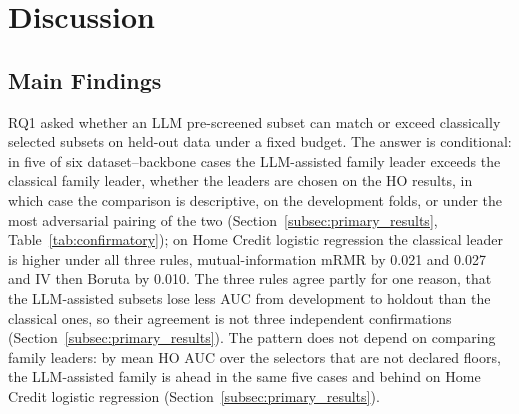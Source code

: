 \documentclass[final,5p,twocolumn]{elsarticle}
\providecommand{\DIFaddbegin}{} %
\begin{document}

\section{Discussion}
\label{sec:discussion}

\subsection{Main Findings}
\label{subsec:main_findings}

RQ1 asked whether an LLM pre-screened subset can match or exceed classically selected subsets on held-out data under a fixed budget. The answer is conditional: in five of six dataset--backbone cases the LLM-assisted family leader exceeds the classical family leader, whether the leaders are chosen on the HO results, in which case the comparison is descriptive, on the development folds, or under the most adversarial pairing of the two (Section~\ref{subsec:primary_results}, Table~\ref{tab:confirmatory}); on Home Credit logistic regression the classical leader is higher under all three rules, mutual-information mRMR by 0.021 and 0.027 and IV then Boruta by 0.010. The three rules agree partly for one reason, that the LLM-assisted subsets lose less AUC from development to holdout than the classical ones, so their agreement is not three independent confirmations (Section~\ref{subsec:primary_results}). The pattern does not depend on comparing family leaders: by mean HO AUC over the selectors that are not declared floors, the LLM-assisted family is ahead in the same five cases and behind on Home Credit logistic regression (Section~\ref{subsec:primary_results}).
\DIFaddbegin 
\end{document}
